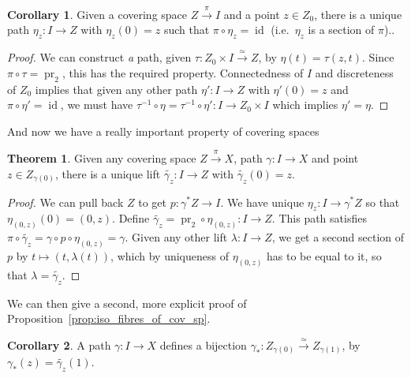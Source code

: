 \documentclass{tufte-handout}
\DeclareMathOperator{\id}{id}
\DeclareMathOperator{\pr}{pr}
\theoremstyle{definition}
\newtheorem{theorem}{Theorem}
\newtheorem{corollary}{Corollary}
\begin{document}

\begin{corollary}
Given a covering space $Z\xrightarrow{\pi}I$ and a point $z\in Z_0$, there is a unique path
$\eta_z\colon I \to Z$ with $\eta_z(0)=z$ such that $\pi\circ \eta_z = \id$ (i.e.\ $\eta_z$ is a section of $\pi$)..
\end{corollary}

\begin{proof}
We can construct \emph{a} path, given $\tau\colon Z_0 \times I \xrightarrow{\simeq} Z$, by $\eta(t) = \tau(z,t)$. Since $\pi\circ\tau = \pr_2$, this has the required property.
Connectedness of $I$ and discreteness of $Z_0$ implies that given any other path $\eta'\colon I \to Z$ with $\eta'(0) = z$ and $\pi\circ \eta'=\id$, we must have $\tau^{-1}\circ \eta = \tau^{-1}\circ \eta'\colon I\to Z_0\times I$ which implies $\eta'=\eta$.
\end{proof}

And now we have a really important property of covering spaces

\begin{theorem}\label{prop:unique_path_lifting}
Given any covering space $Z\xrightarrow{\pi}X$, path $\gamma\colon I\to X$ and point $z\in Z_{\gamma(0)}$, 
there is a unique lift $\widetilde{\gamma_z}\colon I\to Z$  with $\widetilde{\gamma_z}(0)=z$.
\end{theorem}

\begin{proof}
We can pull back $Z$ to get $p\colon \gamma^*Z\to I$. We have unique $\eta_z\colon I\to \gamma^*Z$
so that $\eta_{(0,z)}(0) = (0,z)$. Define $\widetilde{\gamma_z} = \pr_2\circ \eta_{(0,z)}\colon I \to Z$.
This path satisfies $\pi\circ\widetilde{\gamma_z} = \gamma\circ p\circ\eta_{(0,z)} = \gamma$.
Given any other lift $\lambda\colon I\to Z$, we get a second section of $p$ by $t\mapsto (t,\lambda(t))$, which by uniqueness of $\eta_{(0,z)}$ has to be equal to it, so that $\lambda = \widetilde{\gamma_z}$.
\end{proof}

We can then give a second, more explicit proof of Proposition~\ref{prop:iso_fibres_of_cov_sp}.

\begin{corollary}
A path $\gamma\colon I\to X$ defines a bijection 
$\gamma_*\colon Z_{\gamma(0)} \xrightarrow{\simeq} Z_{\gamma(1)}$, by 
$\gamma_*(z) = \widetilde{\gamma_z}(1)$.
\end{corollary}
\end{document}
